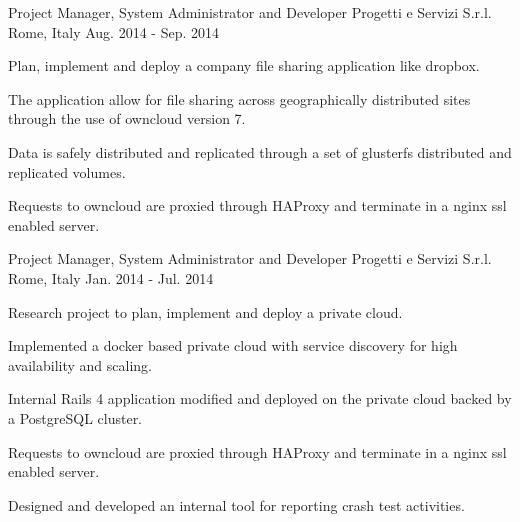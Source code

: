\begin{cventries}
  \cventry
    {Project Manager, System Administrator and Developer} %
    {Progetti e Servizi S.r.l.} %
    {Rome, Italy} %
    {Aug. 2014 - Sep. 2014} %
    {
      \begin{cvitems} %
        \item {Plan, implement and deploy a company file sharing application like dropbox.}
        \item {The application allow for file sharing across geographically distributed sites through the use of owncloud version 7.}
        \item {Data is safely distributed and replicated through a set of glusterfs distributed and replicated volumes.}
        \item {Requests to owncloud are proxied through HAProxy and terminate in a nginx ssl enabled server.}
      \end{cvitems}
    }

  \cventry
    {Project Manager, System Administrator and Developer} %
    {Progetti e Servizi S.r.l.} %
    {Rome, Italy} %
    {Jan. 2014 - Jul. 2014} %
    {
      \begin{cvitems} %
        \item {Research project to plan, implement and deploy a private cloud.}
        \item {Implemented a docker based private cloud with service discovery for high availability and scaling.}
        \item {Internal Rails 4 application modified and deployed on the private cloud backed by a PostgreSQL cluster.}
        \item {Requests to owncloud are proxied through HAProxy and terminate in a nginx ssl enabled server.}
        \item {Designed and developed an internal tool for reporting crash test activities.}
          \begin{cvsubentries}
          \end{cvsubentries}
      \end{cvitems}
    }


\end{cventries}
